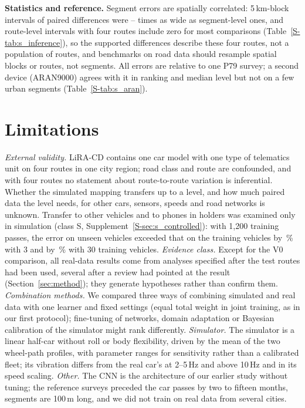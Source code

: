 \textbf{Statistics and reference.}
Segment errors are spatially correlated: 5\,km-block intervals of paired differences were \infWidthRatioMin--\infWidthRatioMax{} times as wide as segment-level ones, and route-level intervals with four routes include zero for most comparisons (Table~\ref{S-tab:s_inference}), so the supported differences describe these four routes, not a population of routes, and benchmarks on road data should resample spatial blocks or routes, not segments.
All errors are relative to one P79 survey; a second device (ARAN9000) agrees with it in ranking and median level but not on a few urban segments (Table~\ref{S-tab:s_aran}).

\section{Limitations}
\label{sec:limitations}
\emph{External validity.}
LiRA-CD contains one car model with one type of telematics unit on four routes in one city region; road class and route are confounded, and with four routes no statement about route-to-route variation is inferential.
Whether the simulated mapping transfers up to a level, and how much paired data the level needs, for other cars, sensors, speeds and road networks is unknown.
Transfer to other vehicles and to phones in holders was examined only in simulation (class S, Supplement~\ref{S-sec:s_controlled}): with 1,200 training passes, the error on unseen vehicles exceeded that on the training vehicles by \vsThreeRel\,\% with 3 and by \vsThirtyRel\,\% with 30 training vehicles.
\emph{Evidence class.}
Except for the V0 comparison, all real-data results come from analyses specified after the test routes had been used, several after a review had pointed at the result (Section~\ref{sec:method}); they generate hypotheses rather than confirm them.
\emph{Combination methods.}
We compared three ways of combining simulated and real data with one learner and fixed settings (equal total weight in joint training, as in our first protocol); fine-tuning of networks, domain adaptation or Bayesian calibration of the simulator might rank differently.
\emph{Simulator.}
The simulator is a linear half-car without roll or body flexibility, driven by the mean of the two wheel-path profiles, with parameter ranges for sensitivity rather than a calibrated fleet; its vibration differs from the real car's at 2--5\,Hz and above 10\,Hz and in its speed scaling.
\emph{Other.}
The CNN is the architecture of our earlier study without tuning; the reference surveys preceded the car passes by two to fifteen months, segments are 100\,m long, and we did not train on real data from several cities.
